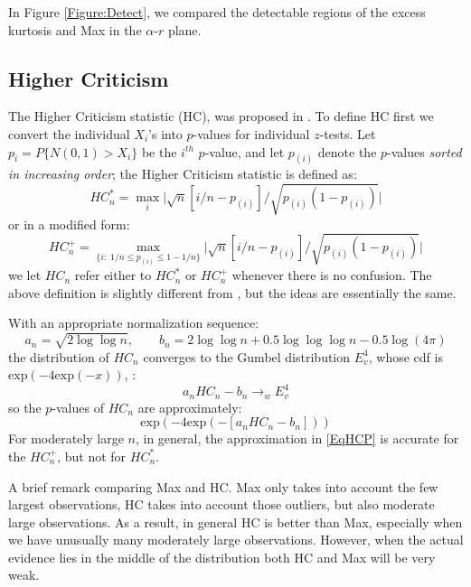 In Figure \ref{Figure:Detect}, we compared the detectable regions of the excess kurtosis and Max in the $\alpha$-$r$ plane. 

\subsection{Higher Criticism}
\label{sec:HC}

The Higher Criticism statistic (HC), was proposed in \citep{gauss:lin02}. To define HC first we convert the individual $X_i$'s 
into $p$-values for individual $z$-tests. Let $p_i = P\{ N(0,1) > X_i \}$ be the $i^{th}$ $p$-value, and let $p_{(i)}$ denote 
the $p$-values {\it sorted in increasing order}; the Higher Criticism statistic is defined as:
\[
       HC_{n}^* =  \max_{i}
         \biggl| \sqrt{n} [i/n  - p_{(i)}]/ \sqrt{p_{(i)} (1-p_{(i)})} \biggr|
\]
or in a modified form:
\[
HC_n^+  = \max_{\{i:  \; 1/n  \leq  p_{(i)} \leq  1 - 1/n \}}
         \biggl|   \sqrt{n} [i/n  - p_{(i)}]/ \sqrt{p_{(i)} (1-p_{(i)})}  \biggr|
\]
we let $HC_n$ refer either to $HC_n^*$ or $HC_n^+$ whenever there is no confusion. The above definition is slightly 
different from \citep{gauss:lin02}, but the ideas are essentially the same.

With an appropriate normalization sequence:
\[
a_n = \sqrt{2 \log \log n}, \qquad b_n = 2 \log \log n + 0.5 \log \log \log n - 0.5 \log (4 \pi)
\]
the distribution of $HC_n$ converges to  the Gumbel distribution $E_v^4$, whose cdf is $\mathrm{exp}(-4\mathrm{exp}(-x))$, \citep{Shorack}:
\[
a_n  HC_n - b_n  \rightarrow_w  E_v^4
\]
so the $p$-values of $HC_n$ are approximately:
\begin{equation}  
\label{EqHCP}
\mathrm{exp}(-4\mathrm{exp}( - [a_n HC_n - b_n]))
\end{equation}
For moderately large $n$, in general, the approximation in \eqref{EqHCP} is accurate for the $HC_n^+$, but not for $HC_n^*$.   

A brief remark comparing Max and HC. Max only takes into account the few largest observations, HC takes into account those outliers, 
but also moderate large observations. As a result, in general HC is better than Max, especially when we have unusually many moderately 
large observations. However, when the actual evidence lies in the middle of the distribution both HC and Max will be very weak.


